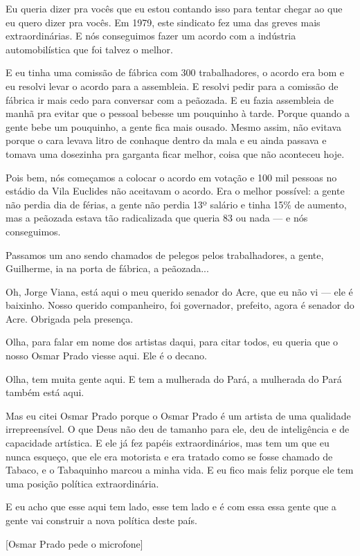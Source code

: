 Eu queria dizer pra vocês que eu estou contando isso para tentar
chegar ao que eu quero dizer pra vocês. Em 1979, este sindicato fez uma
das greves mais extraordinárias. E nós conseguimos fazer um acordo com a
indústria automobilística que foi talvez o melhor.

E eu tinha uma comissão de fábrica com 300 trabalhadores, o acordo
era bom e eu resolvi levar o acordo para a assembleia. E resolvi pedir
para a comissão de fábrica ir mais cedo para conversar com a peãozada. E
eu fazia assembleia de manhã pra evitar que o pessoal bebesse um
pouquinho à tarde. Porque quando a gente bebe um pouquinho, a gente fica
mais ousado. Mesmo assim, não evitava porque o cara levava litro de
conhaque dentro da mala e eu ainda passava e tomava uma dosezinha pra
garganta ficar melhor, coisa que não aconteceu hoje.

Pois bem, nós começamos a colocar o acordo em votação e 100 mil
pessoas no estádio da Vila Euclides não aceitavam o acordo. Era o melhor
possível: a gente não perdia dia de férias, a gente não perdia 13º
salário e tinha 15\% de aumento, mas a peãozada estava tão radicalizada
que queria 83 ou nada --- e nós conseguimos.

Passamos um ano sendo chamados de pelegos pelos trabalhadores, a
gente, Guilherme, ia na porta de fábrica, a peãozada...

Oh, Jorge Viana, está aqui o meu querido senador do Acre, que eu
não vi --- ele é baixinho. Nosso querido companheiro, foi governador,
prefeito, agora é senador do Acre. Obrigada pela presença.

Olha, para falar em nome dos artistas daqui, para citar todos, eu
queria que o nosso Osmar Prado viesse aqui. Ele é o decano.

Olha, tem muita gente aqui. E tem a mulherada do Pará, a mulherada
do Pará também está aqui.

Mas eu citei Osmar Prado porque o Osmar Prado é um artista de uma
qualidade irrepreensível. O que Deus não deu de tamanho para ele, deu de
inteligência e de capacidade artística. E ele já fez papéis
extraordinários, mas tem um que eu nunca esqueço, que ele era motorista
e era tratado como se fosse chamado de Tabaco, e o Tabaquinho marcou a
minha vida. E eu fico mais feliz porque ele tem uma posição política
extraordinária.

E eu acho que esse aqui tem lado, esse tem lado e é com essa essa
gente que a gente vai construir a nova política deste país.

[Osmar Prado pede o microfone]

